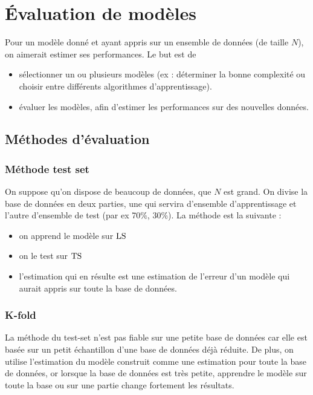 \chapter{Évaluation de modèles}

Pour un modèle donné et ayant appris sur un ensemble de données (de taille $N$), on aimerait estimer ses performances. Le but est de

\begin{itemize}
	\item sélectionner un ou plusieurs modèles (ex : déterminer la bonne complexité ou choisir entre différents algorithmes d'apprentissage).
	\item évaluer les modèles, afin d'estimer les performances sur des nouvelles données.
\end{itemize}


\section{Méthodes d'évaluation}
	\subsection{Méthode test set}

	On suppose qu'on dispose de beaucoup de données, que $N$ est grand. On divise la base de données en deux parties, une qui servira d'ensemble d'apprentissage et l'autre d'ensemble de test (par ex 70\%, 30\%). La méthode est la suivante :

	\begin{itemize}
		\item on apprend le modèle sur $\text{LS}$
		\item on le test sur $\text{TS}$
		\item l'estimation qui en résulte est une estimation de l'erreur d'un modèle qui aurait appris sur toute la base de données.
	\end{itemize}
	
	
	\subsection{K-fold}
	
	La méthode du test-set n'est pas fiable sur une petite base de données car elle est basée sur un petit échantillon d'une base de données déjà réduite. De plus, on utilise l'estimation du modèle construit comme une estimation pour toute la base de données, or lorsque la base de données est très petite, apprendre le modèle sur toute la base ou sur une partie change fortement les résultats.
	
